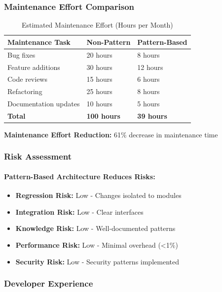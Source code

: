 \documentclass[11pt, a4paper]{article}
\theoremstyle{plain}
\theoremstyle{definition}
\begin{document}
\subsubsection{Maintenance Effort Comparison}

\begin{table}[H]
\centering
\caption{Estimated Maintenance Effort (Hours per Month)}
\label{tab:maintenance-effort}
\begin{tabularx}{\textwidth}{lXX}
\toprule
\textbf{Maintenance Task} & \textbf{Non-Pattern} & \textbf{Pattern-Based} \\
\midrule
Bug fixes & 20 hours & 8 hours \\
Feature additions & 30 hours & 12 hours \\
Code reviews & 15 hours & 6 hours \\
Refactoring & 25 hours & 8 hours \\
Documentation updates & 10 hours & 5 hours \\
\textbf{Total} & \textbf{100 hours} & \textbf{39 hours} \\
\bottomrule
\end{tabularx}
\end{table}

\textbf{Maintenance Effort Reduction:} 61\% decrease in maintenance time

\subsubsection{Risk Assessment}

\paragraph{Pattern-Based Architecture Reduces Risks:}
\begin{itemize}
    \item \textbf{Regression Risk:} Low - Changes isolated to modules
    \item \textbf{Integration Risk:} Low - Clear interfaces
    \item \textbf{Knowledge Risk:} Low - Well-documented patterns
    \item \textbf{Performance Risk:} Low - Minimal overhead (<1\%)
    \item \textbf{Security Risk:} Low - Security patterns implemented
\end{itemize}

\subsubsection{Developer Experience}
\end{document}
